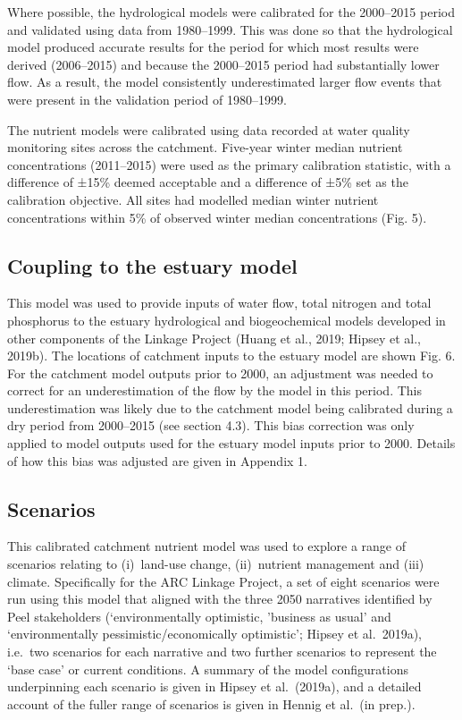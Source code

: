\documentclass[
]{book}
\begin{document}
Where possible, the hydrological models were calibrated for the 2000--2015 period and validated using data from 1980--1999. This was done so that the hydrological model produced accurate results for the period for which most results were derived (2006--2015) and because the 2000--2015 period had substantially lower flow. As a result, the model consistently underestimated larger flow events that were present in the validation period of 1980--1999.

The nutrient models were calibrated using data recorded at water quality monitoring sites across the catchment. Five-year winter median nutrient concentrations (2011--2015) were used as the primary calibration statistic, with a difference of ±15\% deemed acceptable and a difference of ±5\% set as the calibration objective. All sites had modelled median winter nutrient concentrations within 5\% of observed winter median concentrations (Fig. 5).

\hypertarget{coupling-to-the-estuary-model}{%
\subsection{Coupling to the estuary model}\label{coupling-to-the-estuary-model}}

This model was used to provide inputs of water flow, total nitrogen and total phosphorus to the estuary hydrological and biogeochemical models developed in other components of the Linkage Project (Huang et al., 2019; Hipsey et al., 2019b). The locations of catchment inputs to the estuary model are shown Fig. 6. For the catchment model outputs prior to 2000, an adjustment was needed to correct for an underestimation of the flow by the model in this period. This underestimation was likely due to the catchment model being calibrated during a dry period from 2000--2015 (see section 4.3). This bias correction was only applied to model outputs used for the estuary model inputs prior to 2000. Details of how this bias was adjusted are given in Appendix 1.~

\hypertarget{scenarios}{%
\subsection{Scenarios}\label{scenarios}}

This calibrated catchment nutrient model was used to explore a range of scenarios relating to (i)~land-use change, (ii)~nutrient management and (iii) climate. Specifically for the ARC Linkage Project, a set of eight scenarios were run using this model that aligned with the three 2050 narratives identified by Peel stakeholders (`environmentally optimistic, 'business as usual' and `environmentally pessimistic/economically optimistic'; Hipsey et al.~2019a), i.e.~two scenarios for each narrative and two further scenarios to represent the `base case' or current conditions. A summary of the model configurations underpinning each scenario is given in Hipsey et al.~(2019a), and a detailed account of the fuller range of scenarios is given in Hennig et al.~(in prep.).~
\end{document}
